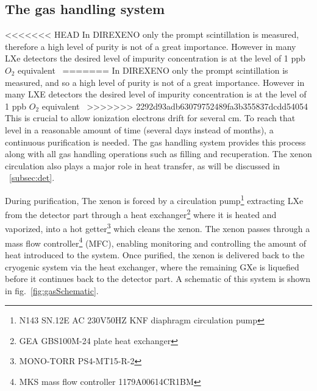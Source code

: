\subsection{The gas handling system}
\label{subsec:gas}

<<<<<<< HEAD
In DIREXENO only the prompt scintillation is measured, therefore a high level of purity is not of a great importance. However in many LXe detectors the desired level of impurity concentration is at the level of 1 ppb $O_2$ equivalent~\cite{Aprile:2009dv}
=======
In DIREXENO only the prompt scintillation is measured, and so a high level of purity is not of a great importance. However in many LXE detectors the desired level of impurity concentration is at the level of 1 ppb $O_2$ equivalent~\cite{Aprile:2009dv}
>>>>>>> 2292d93adb63079752489fa3b355837dcdd54054
This is crucial to allow 
ionization electrons drift for several cm. To reach that level in a reasonable amount 
of time (several days instead of months), 
a continuous purification is needed. The gas handling system provides this process along 
with all gas handling operations such as filling and recuperation. The xenon circulation also plays a major role in heat transfer, as will be discussed in ~\ref{subsec:det}.


During purification, The xenon is forced by a circulation pump\footnote{N143 SN.12E AC 230V50HZ KNF diaphragm circulation pump} extracting LXe from the detector part through a heat exchanger\footnote{GEA GBS100M-24 plate heat exchanger} 
where it is heated and vaporized, into a hot getter\footnote{MONO-TORR PS4-MT15-R-2} which cleans the xenon. The xenon passes through a mass flow controller\footnote{MKS mass flow controller 1179A00614CR1BM} (MFC), 
enabling monitoring and controlling the amount of heat introduced to the system.  Once purified, the xenon is delivered back to the cryogenic system 
via the heat exchanger, where the remaining GXe is 
liquefied before it continues back to the detector part. A schematic of this 
system is shown in fig.~\ref{fig:gasSchematic}.


